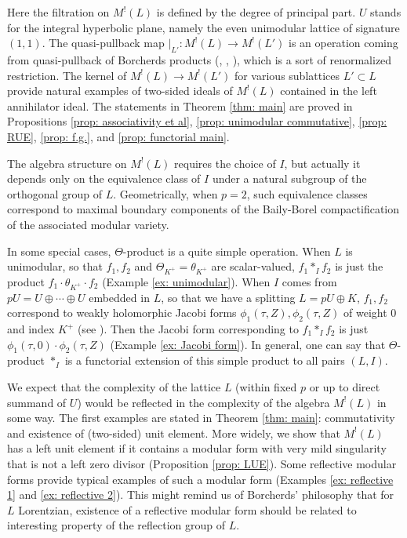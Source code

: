 \documentclass[12pt]{amsart}
\numberwithin{equation}{section}
\theoremstyle{definition}
\theoremstyle{remark}
\newcommand{\ThetaK}{\Theta_{K^{+}}}
\newcommand{\ML}{M^{!}(L)}
\begin{document}
Here the filtration on ${\ML}$ is defined by the degree of principal part. 
$U$ stands for the integral hyperbolic plane, namely 
the even unimodular lattice of signature $(1, 1)$. 
The quasi-pullback map $|_{L'}\colon {\ML}\to M^{!}(L')$  
is an operation coming from quasi-pullback of Borcherds products (\cite{Bo95}, \cite{B-K-P-SB}, \cite{Ma}), 
which is a sort of renormalized restriction.  
The kernel of ${\ML}\to M^{!}(L')$ for various sublattices $L'\subset L$ 
provide natural examples of two-sided ideals of ${\ML}$ contained in the left annihilator ideal. 
The statements in Theorem \ref{thm: main} are proved in Propositions 
\ref{prop: associativity et al}, 
\ref{prop: unimodular commutative}, 
\ref{prop: RUE}, 
\ref{prop: f.g.}, and 
\ref{prop: functorial main}. 


The algebra structure on ${\ML}$ requires the choice of $I$, 
but actually it depends only on the equivalence class of $I$ under a natural subgroup 
of the orthogonal group of $L$. 
Geometrically, when $p=2$, such equivalence classes correspond to 
maximal boundary components of the Baily-Borel compactification of the associated modular variety. 

In some special cases, $\Theta$-product is a quite simple operation. 
When $L$ is unimodular, so that $f_{1}, f_{2}$ and ${\ThetaK}=\theta_{K^{+}}$ are scalar-valued, 
$f_{1}\ast_{I}f_{2}$ is just the product $f_{1} \cdot \theta_{K^+} \cdot f_{2}$ (Example \ref{ex: unimodular}). 
When $I$ comes from $pU=U\oplus \cdots \oplus U$ embedded in $L$, 
so that we have a splitting $L=pU\oplus K$, 
$f_{1}, f_{2}$ correspond to weakly holomorphic Jacobi forms $\phi_{1}(\tau, Z), \phi_{2}(\tau, Z)$ 
of weight $0$ and index $K^+$ (see \cite{Gr}). 
Then the Jacobi form corresponding to $f_{1}\ast_{I}f_{2}$ is just 
$\phi_{1}(\tau, 0)\cdot \phi_{2}(\tau, Z)$ (Example \ref{ex: Jacobi form}). 
In general, one can say that $\Theta$-product $\ast_{I}$ is a functorial extension of  
this simple product to all pairs $(L, I)$. 

We expect that 
the complexity of the lattice $L$ (within fixed $p$ or up to direct summand of $U$) 
would be reflected in the complexity of the algebra ${\ML}$ in some way. 
The first examples are stated in Theorem \ref{thm: main}: 
commutativity and existence of (two-sided) unit element. 
More widely, we show that 
${\ML}$ has a left unit element 
if it contains a modular form with very mild singularity that is not a left zero divisor 
(Proposition \ref{prop: LUE}). 
Some reflective modular forms provide typical examples of such a modular form 
(Examples \ref{ex: reflective 1} and \ref{ex: reflective 2}). 
This might remind us of 
Borcherds' philosophy \cite{Bo00b} that 
for $L$ Lorentzian, 
existence of a reflective modular form 
should be related to interesting property of the reflection group of $L$. 
\end{document}
